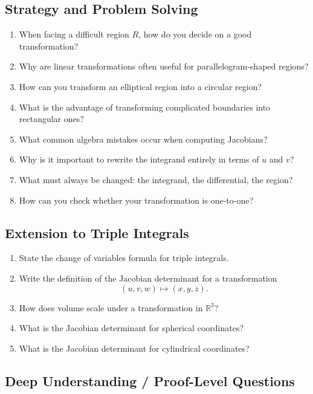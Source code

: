 \subsection{Strategy and Problem Solving}

\begin{enumerate}[resume]
  \item When facing a difficult region \(R\), how do you decide on a good transformation?
  \item Why are linear transformations often useful for parallelogram-shaped regions?
  \item How can you transform an elliptical region into a circular region?
  \item What is the advantage of transforming complicated boundaries into rectangular ones?
  \item What common algebra mistakes occur when computing Jacobians?
  \item Why is it important to rewrite the integrand entirely in terms of \(u\) and \(v\)?
  \item What must always be changed: the integrand, the differential, the region?
  \item How can you check whether your transformation is one-to-one?
\end{enumerate}

\subsection{Extension to Triple Integrals}

\begin{enumerate}[resume]
  \item State the change of variables formula for triple integrals.
  \item Write the definition of the Jacobian determinant for a transformation
    \[ (u,v,w) \mapsto (x,y,z). \]
  \item How does volume scale under a transformation in \(\mathbb{R}^{3}\)?
  \item What is the Jacobian determinant for spherical coordinates?
  \item What is the Jacobian determinant for cylindrical coordinates?
\end{enumerate}

\subsection{Deep Understanding / Proof-Level Questions}

